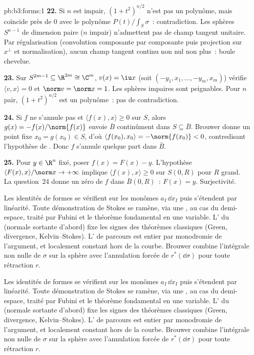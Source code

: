 \begin{solution}{pb:b3:forms:1}
\textbf{22.} Si $n$ est impair, $(1+t^2)^{n/2}$ n'est pas
un polynôme, mais coïncide près de $0$ avec le polynôme
$P(t)/\int_S\sigma$~: contradiction. Les sphères
$S^{n-1}$ de dimension paire ($n$ impair) n'admettent pas
de champ tangent unitaire. Par régularisation
(convolution composante par composante puis projection sur
$x^\perp$ et normalisation), aucun champ tangent continu
non nul non plus~: boule chevelue.

\textbf{23.} Sur $S^{2m-1} \subseteq \R^{2m} \cong \C^m$,
$v(x) = \iu x$ (soit $(-y_1,x_1,\dots,-y_m,x_m)$) vérifie
$\langle v,x\rangle = 0$ et $\norm v = \norm x = 1$. Les
sphères impaires sont peignables. Pour $n$ pair,
$(1+t^2)^{n/2}$ est un polynôme~: pas de contradiction.

\textbf{24.} Si $f$ ne s'annule pas et $\langle f(x),x
\rangle \geq 0$ sur $S$, alors $g(x) =
-f(x)/\norm{f(x)}$ envoie $\bar B$ continûment dans $S
\subseteq \bar B$. Brouwer donne un point fixe $x_0 =
g(x_0) \in S$, d'où $\langle f(x_0), x_0\rangle =
-\norm{f(x_0)} < 0$, contredisant l'hypothèse de .
Donc $f$ s'annule quelque part dans $\bar B$.

\textbf{25.} Pour $y \in \R^n$ fixé, poser $f(x) = F(x) -
y$. L'hypothèse $\langle F(x),x\rangle/\norm x \to
+\infty$ implique $\langle f(x),x\rangle \geq 0$ sur
$S(0,R)$ pour $R$ grand. La question~24 donne un zéro de
$f$ dans $\bar B(0,R)$~: $F(x) = y$. Surjectivité.


Les identités de formes se vérifient sur les monômes $a_I\,\dd x_I$
puis s'étendent par linéarité. Toute démonstration de Stokes
se ramène, via une , au cas du demi-espace,
traité par Fubini et le théorème fondamental en une variable.
L' du  (normale sortante d'abord) fixe les signes
des théorèmes classiques (Green, divergence, Kelvin--Stokes).
L' de parcours est entier par monodromie de l'argument,
et localement constant hors de la courbe. Brouwer combine
l'intégrale non nulle de $\sigma$ sur la sphère avec l'annulation
forcée de $r^*(\dd\sigma)$ pour toute rétraction $r$.

Les identités de formes se vérifient sur les monômes $a_I\,\dd x_I$
puis s'étendent par linéarité. Toute démonstration de Stokes
se ramène, via une , au cas du demi-espace,
traité par Fubini et le théorème fondamental en une variable.
L' du  (normale sortante d'abord) fixe les signes
des théorèmes classiques (Green, divergence, Kelvin--Stokes).
L' de parcours est entier par monodromie de l'argument,
et localement constant hors de la courbe. Brouwer combine
l'intégrale non nulle de $\sigma$ sur la sphère avec l'annulation
forcée de $r^*(\dd\sigma)$ pour toute rétraction $r$.


\end{solution}

